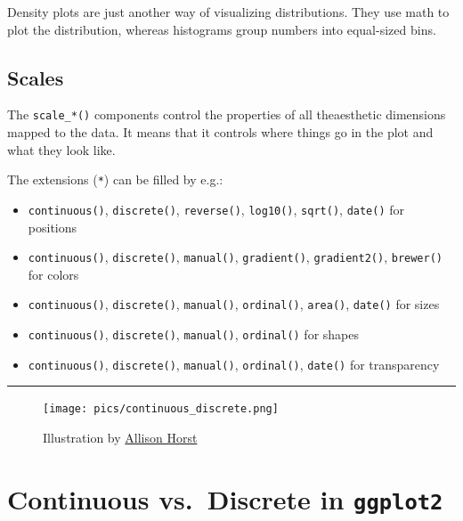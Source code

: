 \documentclass[
  letterpaper,
  DIV=11,
  numbers=noendperiod,
  oneside]{scrreprt}
\begin{document}
Density plots are just another way of visualizing distributions. They
use math to plot the distribution, whereas histograms group numbers into
equal-sized bins.

\hypertarget{scales}{%
\subsection{Scales}\label{scales}}

The \texttt{scale\_*()} components control the properties of all
theaesthetic dimensions mapped to the data. It means that it controls
where things go in the plot and what they look like.

The extensions (\texttt{*}) can be filled by e.g.:

\begin{itemize}
\item
  \texttt{continuous()}, \texttt{discrete()}, \texttt{reverse()},
  \texttt{log10()}, \texttt{sqrt()}, \texttt{date()} for positions
\item
  \texttt{continuous()}, \texttt{discrete()}, \texttt{manual()},
  \texttt{gradient()}, \texttt{gradient2()}, \texttt{brewer()} for
  colors
\item
  \texttt{continuous()}, \texttt{discrete()}, \texttt{manual()},
  \texttt{ordinal()}, \texttt{area()}, \texttt{date()} for sizes
\item
  \texttt{continuous()}, \texttt{discrete()}, \texttt{manual()},
  \texttt{ordinal()} for shapes
\item
  \texttt{continuous()}, \texttt{discrete()}, \texttt{manual()},
  \texttt{ordinal()}, \texttt{date()} for transparency
\end{itemize}

\begin{center}\rule{0.5\linewidth}{0.5pt}\end{center}

\begin{figure}

{\centering \texttt{[image: pics/continuous\_discrete.png]}

}

\caption{Illustration by
\href{https://github.com/allisonhorst/stats-illustrations}{Allison
Horst}}

\end{figure}

\hypertarget{continuous-vs.-discrete-in-ggplot2}{%
\section{\texorpdfstring{Continuous vs.~Discrete in
\texttt{ggplot2}}{Continuous vs.~Discrete in ggplot2}}\label{continuous-vs.-discrete-in-ggplot2}}
\end{document}

